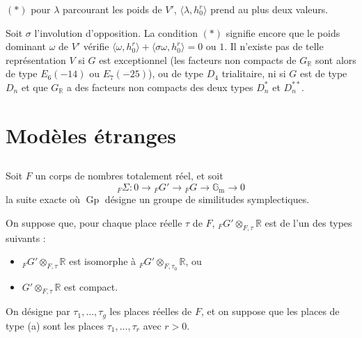 \documentclass[11pt]{amsart}
\theoremstyle{plain}
\theoremstyle{definition}
\DeclareMathOperator{\Gp}{Gp}
\newcommand{\RR}{\mathbb{R}}
\begin{document}
$(*)$ pour $\lambda$ parcourant les poids de $V'$, $\langle \lambda, h_0^r \rangle$ prend au plus deux valeurs.

Soit $\sigma$ l'involution d'opposition. La condition $(*)$ signifie encore que le poids dominant $\omega$ de $V'$ v\'erifie $\langle \omega, h_0^r \rangle + \langle \sigma \omega, h_0^r \rangle = 0$ ou $1$. Il n'existe pas de telle repr\'esentation $V$ si $G$ est exceptionnel (les facteurs non compacts de $G_{\RR}$ sont alors de type $E_6(-14)$ ou $E_7(-25)$), ou de type $D_4$ trialitaire, ni si $G$ est de type $D_n$ et que $G_{\RR}$ a des facteurs non compacts des deux types $D_n^*$ et $D_n^{**}$.

\section{Mod\`eles \'etranges}

\subsection{}

Soit $F$ un corps de nombres totalement r\'eel, et soit
\begin{equation}\label{eq:6.1.1}
{}_F \Sigma : 0 \longrightarrow {}_F G' \longrightarrow {}_F G \longrightarrow \mathbb{G}_{\mathrm{m}} \longrightarrow 0
\end{equation}
la suite exacte o\`u $\Gp$ d\'esigne un groupe de similitudes symplectiques.

On suppose que, pour chaque place r\'eelle $\tau$ de $F$, ${}_F G' \otimes_{F,\tau} \RR$ est de l'un des types suivants :
\begin{itemize}
\item[(a)] ${}_F G' \otimes_{F,\tau} \RR$ est isomorphe \`a ${}_F G' \otimes_{F,\tau_0} \RR$, ou
\item[(b)] $G' \otimes_{F,\tau} \RR$ est compact.
\end{itemize}
On d\'esigne par $\tau_1, \ldots, \tau_g$ les places r\'eelles de $F$, et on suppose que les places de type (a) sont les places $\tau_1, \ldots, \tau_r$ avec $r > 0$.

\subsection{}
\end{document}

